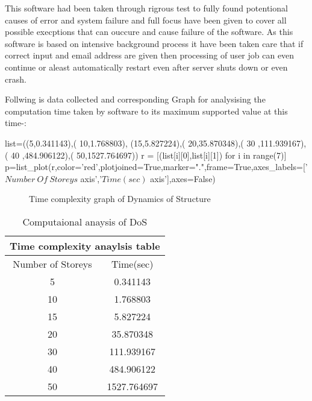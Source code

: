 This software had been taken through rigrous test to fully found potentional causes of error and system failure
and full focus have been given to cover all possible execptions that can 
ouccure and cause failure of the software.
As this software is based on intensive background process it have been taken care that 
if correct input and email address are given then processing of user job can even continue or aleast automatically 
restart even after server shuts down or even crash.

Follwing is data collected and corresponding Graph for analysising the computation time taken by software 
to its maximum supported value at this time-:
\begin{sagesilent}
list=((5,0.341143),(
10,1.768803),
(15,5.827224),(
20,35.870348),(
30 ,111.939167),(
40 ,484.906122),(
50,1527.764697))
r = [(list[i][0],list[i][1]) for i in range(7)]
p=list_plot(r,color='red',plotjoined=True,marker=".",frame=True,axes_labels=['$Number \ Of \ Storeys$ axis','$Time(sec)$ axis'],axes=False)
\end{sagesilent}

\begin{figure}[H]
	\caption{Time complexity graph of Dynamics of Structure}
\end{figure}



\begin{table}[h]
\centering
\begin{tabular}{ ||c|c|| }
\hline
 \multicolumn{2}{||c||}{Time complexity anaylsis table} \\
 \hline
 Number of Storeys & Time(sec) \\ [0.5ex] 
 \hline \hline
	5 & 0.341143 \\
	10 & 1.768803 \\
	15 & 5.827224 \\
	20 & 35.870348 \\
	30 & 111.939167 \\
	40 & 484.906122 \\
	50 & 1527.764697 \\ [1ex]
 \hline
\end{tabular}
\caption{Computaional anaysis of DoS}
\end{table}


